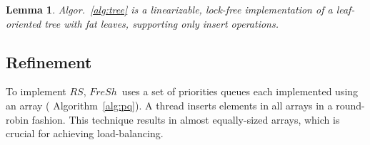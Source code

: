 \documentclass[a4paper,11pt,twoside,openany]{book}
\newtheorem{lemma}{Lemma}[section]
\newcommand{\RS}{\mbox{$\mathit{RS}$}}
\newcommand{\Fresh}{\mbox{$\mathit{FreSh}$}}
\begin{document}
    \begin{lemma}
    \label{lem:tree}
    Algor.~\ref{alg:tree} is a {\em linearizable, lock-free} implementation of a leaf-oriented
    tree with fat leaves, supporting only insert operations.
    \end{lemma}

    \subsection{Refinement}

    To implement \RS, \Fresh\ uses a set of priorities queues
    each implemented using an array ( Algorithm~\ref{alg:pq}). 
    A thread inserts elements in all arrays in a round-robin fashion. 
    This technique results in almost equally-sized arrays, which is crucial
    for achieving load-balancing. 

    
\end{document}
